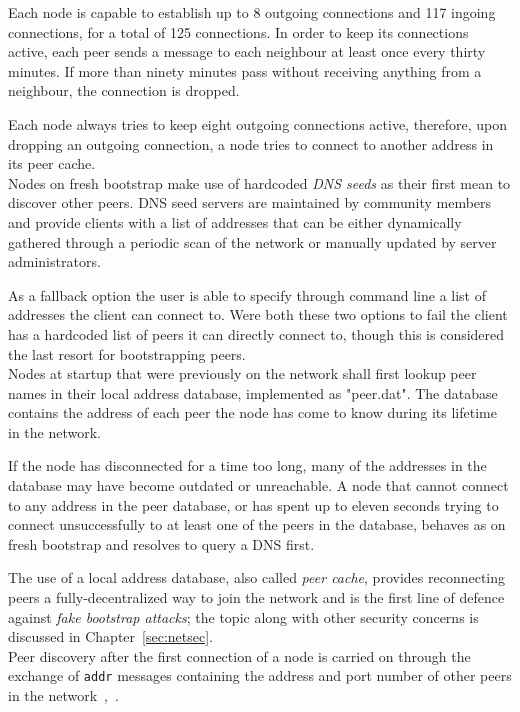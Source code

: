 \documentclass[12pt, letterpaper, twoside]{article}
\begin{document}
Each node is capable to establish up to 8 outgoing connections and 117 ingoing connections, for a total of 125 connections. In order to keep its connections active, each peer sends a message to each neighbour at least once every thirty minutes. If more than ninety minutes pass without receiving anything from a neighbour, the connection is dropped.

Each node always tries to keep eight outgoing connections active, therefore, upon dropping an outgoing connection, a node tries to connect to another address in its peer cache.\\

Nodes on fresh bootstrap make use of hardcoded \emph{DNS seeds} as their first mean to discover other peers. DNS seed servers are maintained by community members and provide clients with a list of addresses that can be either dynamically gathered through a periodic scan of the network or manually updated by server administrators.

As a fallback option the user is able to specify through command line a list of addresses the client can connect to. Were both these two options to fail the client has a hardcoded list of peers it can directly connect to, though this is considered the last resort for bootstrapping peers.\\

Nodes at startup that were previously on the network shall first lookup peer names in their local address database, implemented as "peer.dat". The database contains the address of each peer the node has come to know during its lifetime in the network.

If the node has disconnected for a time too long, many of the addresses in the database may have become outdated or unreachable. A node that cannot connect to any address in the peer database, or has spent up to eleven seconds trying to connect unsuccessfully to at least one of the peers in the database, behaves as on fresh bootstrap and resolves to query a DNS first.

The use of a local address database, also called \emph{peer cache}, provides reconnecting peers a fully-decentralized way to join the network and is the first line of defence against \emph{fake bootstrap attacks}; the topic along with other security concerns is discussed in Chapter~\ref{sec:netsec}.\\

Peer discovery after the first connection of a node is carried on through the exchange of \texttt{addr} messages containing the address and port number of other peers in the network~\cite{protocoldoc},~\cite{devguidep2p}.
\end{document}
